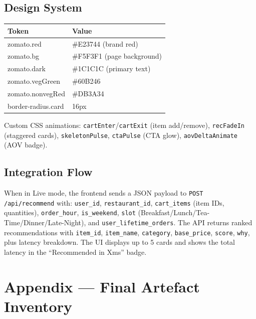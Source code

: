 \documentclass[11pt,a4paper]{article}
\begin{document}
\subsection{Design System}

{\small
\begin{center}
\begin{tabularx}{\linewidth}{>{\ttfamily\RaggedRight\arraybackslash}p{2.8cm} >{\RaggedRight\arraybackslash}X}
  \toprule
  \textbf{Token} & \textbf{Value} \\
  \midrule
  zomato.red     & \#E23744 (brand red) \\
  zomato.bg      & \#F5F3F1 (page background) \\
  zomato.dark    & \#1C1C1C (primary text) \\
  zomato.vegGreen   & \#60B246 \\
  zomato.nonvegRed  & \#DB3A34 \\
  border-radius.card & 16px \\
  \bottomrule
\end{tabularx}
\end{center}
}
\smallskip
Custom CSS animations: \texttt{cartEnter}/\texttt{cartExit} (item add/remove), \texttt{recFadeIn} (staggered cards), \texttt{skeletonPulse}, \texttt{ctaPulse} (CTA glow), \texttt{aovDeltaAnimate} (AOV badge).

\subsection{Integration Flow}

When in Live mode, the frontend sends a JSON payload to \texttt{POST /api/recommend} with: \texttt{user\_id}, \texttt{restaurant\_id}, \texttt{cart\_items} (item IDs, quantities), \texttt{order\_hour}, \texttt{is\_weekend}, \texttt{slot} (Breakfast/Lunch/Tea-Time/Dinner/Late-Night), and \texttt{user\_lifetime\_orders}. The API returns ranked recommendations with \texttt{item\_id}, \texttt{item\_name}, \texttt{category}, \texttt{base\_price}, \texttt{score}, \texttt{why}, plus latency breakdown. The UI displays up to 5 cards and shows the total latency in the ``Recommended in Xms'' badge.

\section*{Appendix --- Final Artefact Inventory}
\end{document}
